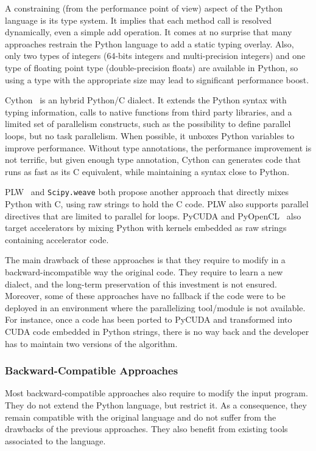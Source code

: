 \documentclass[conference]{IEEEtran}
\begin{document}
A constraining (from the performance point of view) aspect of the Python
language is its type system. It implies that each method call is resolved
dynamically, even a simple add operation. It comes at no surprise that many
approaches restrain the Python language to add a static typing overlay.  Also,
only two types of integers (64-bits integers and multi-precision integers) and
one type of floating point type (double-precision floats) are available in
Python, so using a type with the appropriate size may lead to significant
performance boost.

Cython~\cite{cython2010} is an hybrid Python/C dialect. It extends the Python
syntax with typing information, calls to native functions from third party
libraries, and a limited set of parallelism constructs, such as the possibility
to define parallel loops, but no task parallelism. When possible, it unboxes
Python variables to improve performance. Without type annotations, the
performance improvement is not terrific, but given enough type annotation,
Cython can generates code that runs as fast as its C equivalent, while
maintaining a syntax close to Python.

PLW~\cite{dongara2007} and \texttt{Scipy.weave} both propose another approach
that directly mixes Python with C, using raw strings to hold the C code. PLW
also supports parallel directives that are limited to parallel for loops.
PyCUDA and PyOpenCL~\cite{klockner2012} also target accelerators by mixing
Python with kernels embedded as raw strings containing accelerator code.

The main drawback of these approaches %
is that they require to modify in a
backward-incompatible way the original code. They require to learn a new
dialect, and the long-term preservation of this investment is not ensured.
Moreover, some of these approaches have no fallback if the code were to be
deployed in an environment where the parallelizing tool/module is not available.
For instance, once a code has been ported to PyCUDA and transformed into CUDA
code embedded in Python strings, there is no way back and the developer has to
maintain two versions of the algorithm.

\subsubsection{Backward-Compatible Approaches}

Most backward-compatible approaches also %
require to modify the input program.
They do not extend the Python language, but restrict it. As a consequence, they
remain compatible with the original language and do not suffer from the
drawbacks of the previous approaches. They also benefit from existing tools
associated to the language.
\end{document}
